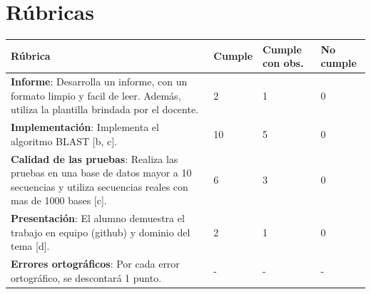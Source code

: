 \documentclass{article}
\begin{document}
\clearpage
\section{Rúbricas}

\begin{table}[hbt!]
	\setlength{\tabcolsep}{0.5em} %
	{\renewcommand{\arraystretch}{1.5}%
		\begin{tabular}{|p{5cm}|x{3cm}|x{3cm}|x{3cm}|}
			\hline 
			\textbf{Rúbrica} & \textbf{Cumple}  & \textbf{Cumple con obs.}  & \textbf{No cumple} \\
			\hline 
			\textbf{Informe}: Desarrolla un informe, con un formato limpio y facil de leer. Además, utiliza la plantilla brindada por el docente.   & 2 & 1 & 0   \\ 
			\hline 
			\textbf{Implementación}: Implementa el algoritmo BLAST [b, c].   & 10 & 5 & 0   \\ \hline			
			
			\textbf{Calidad de las pruebas}: Realiza las pruebas en una base de datos mayor a 10 secuencias y utiliza secuencias reales con mas de 1000 bases [c].  & 6 & 3 & 0   \\ \hline
			
			\textbf{Presentación}: El alumno demuestra el trabajo en equipo (github) y dominio del tema [d]. & 2 & 1 & 0   \\ 			\hline 
			
			\textbf{Errores ortográficos}: Por cada error ortográfico, se descontará 1 punto.  & - & - & -   \\ \hline
			
		\end{tabular}
	}
\end{table}

	
\end{document}
